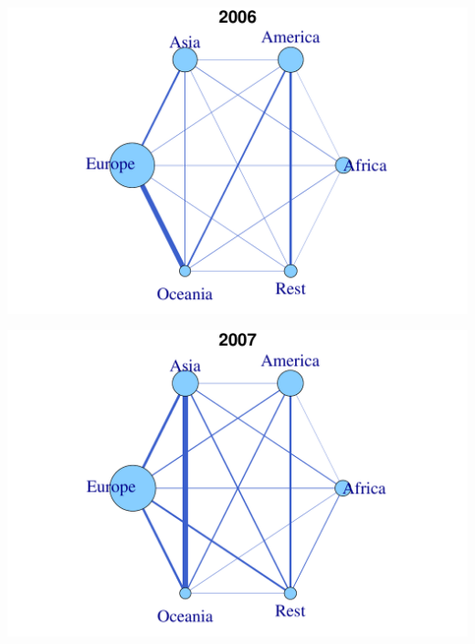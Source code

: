 \documentclass[a4paper,ngerman,oneside,titlepage,bibliography=totoc,11pt]{scrreprt}
\begin{document}
\begin{minipage}[t]{0.48\textwidth}
		\centering
			\includegraphics[width=1\textwidth]{Grafiken/Cont_Ani/cont15.pdf}
\end{minipage}	
\hfill	
\begin{minipage}[t]{0.48\textwidth}	
			\centering
			\includegraphics[width=1\textwidth]{Grafiken/Cont_Ani/cont16.pdf}
\end{minipage}
\end{document}
